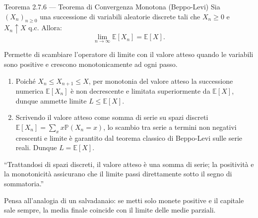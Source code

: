 \documentclass[11pt,a4paper]{report}
\begin{document}
\begin{teoremabox}{Teorema 2.7.6 --- Teorema di Convergenza Monotona (Beppo-Levi)}
Sia $(X_n)_{n \ge 0}$ una successione di variabili aleatorie discrete tali che $X_n \ge 0$ e $X_n \uparrow X$ q.c. Allora:
\[
\lim_{n \to \infty} \mathbb{E}[X_n] = \mathbb{E}[X].
\]

\begin{cosafa}
Permette di scambiare l'operatore di limite con il valore atteso quando le variabili sono positive e crescono monotonicamente ad ogni passo.
\end{cosafa}

\begin{dimostrazione}
\begin{enumerate}
    \item Poiché $X_n \le X_{n+1} \le X$, per monotonia del valore atteso la successione numerica $\mathbb{E}[X_n]$ è non decrescente e limitata superiormente da $\mathbb{E}[X]$, dunque ammette limite $L \le \mathbb{E}[X]$.
    \item Scrivendo il valore atteso come somma di serie su spazi discreti $\mathbb{E}[X_n] = \sum_x x \mathbb{P}(X_n = x)$, lo scambio tra serie a termini non negativi crescenti e limite è garantito dal teorema classico di Beppo-Levi sulle serie reali. Dunque $L = \mathbb{E}[X]$.
\end{enumerate}
\end{dimostrazione}

\begin{oralbox}
``Trattandosi di spazi discreti, il valore atteso è una somma di serie; la positività e la monotonicità assicurano che il limite passi direttamente sotto il segno di sommatoria.''
\end{oralbox}

\begin{tipbox}
Pensa all'analogia di un salvadanaio: se metti solo monete positive e il capitale sale sempre, la media finale coincide con il limite delle medie parziali.
\end{tipbox}
\end{teoremabox}

\newpage
\end{document}
